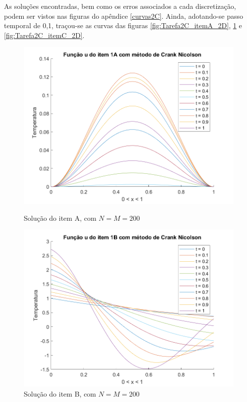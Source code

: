 \documentclass[12pt]{article}
\begin{document}
\begin{spacing}{1.5}
As soluções encontradas, bem como os erros associados a cada discretização, podem ser vistos nas figuras do apêndice \ref{curvas2C}. Ainda, adotando-se passo temporal de 0,1, traçou-se as curvas das figuras \ref{fig:Tarefa2C_itemA_2D}, \ref{fig:Tarefa2C_itemB_2D} e \ref{fig:Tarefa2C_itemC_2D}. 
\begin{figure}[ht!]
\centering
    \begin{minipage}[b]{0.45\linewidth}
    \includegraphics[width=1\linewidth]{Segunda_Tarefa/ItemC/itemA_2D.png}
    \caption{Solução do item A, com $N=M=200$}
    \label{fig:Tarefa2C_itemA_2D}
\end{minipage}
\quad
\begin{minipage}[b]{0.45\linewidth}
    \includegraphics[width=1\linewidth]{Segunda_Tarefa/ItemC/itemB_2D.png}
    \caption{Solução do item B, com $N=M=200$}
    \label{fig:Tarefa2C_itemB_2D}
\end{minipage}
\end{figure}


\end{spacing}
\end{document}
